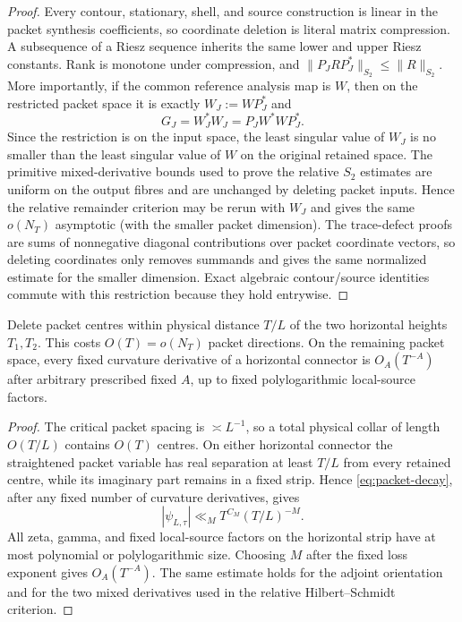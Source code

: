 \begin{proof}
Every contour, stationary, shell, and source construction is linear in the
packet synthesis coefficients, so coordinate deletion is literal matrix
compression. A subsequence of a Riesz sequence inherits the same lower and
upper Riesz constants. Rank is monotone under compression, and
$\|P_JRP_J^*\|_{S_2}\le\|R\|_{S_2}$. More importantly, if the common reference
analysis map is $W$, then on the restricted packet space it is exactly
$W_J:=WP_J^*$ and
\[
G_J=W_J^*W_J=P_JW^*WP_J^*.
\]
Since the restriction is on the input space, the least singular value of $W_J$
is no smaller than the least singular value of $W$ on the original retained
space. The primitive mixed-derivative bounds used to prove the relative $S_2$
estimates are uniform on the output fibres and are unchanged by deleting packet
inputs. Hence the relative remainder criterion
may be rerun with $W_J$ and gives the same $o(N_T)$ asymptotic (with the smaller
packet dimension). The trace-defect proofs are sums of nonnegative diagonal
contributions over packet coordinate vectors, so deleting coordinates only
removes summands and gives the same normalized estimate for the smaller
dimension. Exact algebraic contour/source identities commute with this
restriction because they hold entrywise.
\end{proof}

\begin{lemma}
\label{lem:horizontal-decay}
Delete packet centres within physical distance $T/L$ of the two horizontal
heights $T_1,T_2$. This costs $O(T)=o(N_T)$ packet directions. On the
remaining packet space, every fixed curvature derivative of a horizontal
connector is $O_A(T^{-A})$ after arbitrary prescribed fixed $A$, up to fixed
polylogarithmic local-source factors.
\end{lemma}

\begin{proof}
The critical packet spacing is $\asymp L^{-1}$, so a total physical collar of
length $O(T/L)$ contains $O(T)$ centres. On either horizontal connector the
straightened packet variable has real separation at least $T/L$ from every
retained centre, while its imaginary part remains in a fixed strip. Hence
\eqref{eq:packet-decay}, after any fixed number of curvature derivatives, gives
\[
|\psi_{L,\tau}|\ll_M T^{C_M}(T/L)^{-M}.
\]
All zeta, gamma, and fixed local-source factors on the horizontal strip have at
most polynomial or polylogarithmic size. Choosing $M$ after the fixed
loss exponent gives $O_A(T^{-A})$. The same estimate holds for the adjoint
orientation and for the two mixed derivatives used in the relative
Hilbert--Schmidt criterion.
\end{proof}


